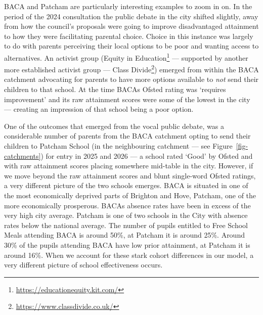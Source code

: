 \documentclass[
  11pt,
]{article}
\begin{document}
BACA and Patcham are particularly interesting examples to zoom in on. In
the period of the 2024 consultation the public debate in the city
shifted slightly, away from how the council's proposals were going to
improve disadvantaged attainment to how they were facilitating parental
choice. Choice in this instance was largely to do with parents
perceiving their local options to be poor and wanting access to
alternatives. An activist group (Equity in Education\footnote{\url{https://educationequity.kit.com/}}
--- supported by another more established activist group --- Class
Divide\footnote{\url{https://www.classdivide.co.uk/}}) emerged from
within the BACA catchment advocating for parents to have more options
available to \emph{not} send their children to that school. At the time
BACAs Ofsted rating was `requires improvement' and its raw attainment
scores were some of the lowest in the city --- creating an impression of
that school being a poor option.

One of the outcomes that emerged from the vocal public debate, was a
considerable number of parents from the BACA catchment opting to send
their children to Patcham School (in the neighbouring catchment --- see
Figure~\ref{fig-catchments}) for entry in 2025 and 2026 --- a school
rated `Good' by Ofsted and with raw attainment scores placing somewhere
mid-table in the city. However, if we move beyond the raw attainment
scores and blunt single-word Ofsted ratings, a very different picture of
the two schools emerges. BACA is situated in one of the most
economically deprived parts of Brighton and Hove, Patcham, one of the
more economically prosperous. BACAs absence rates have been in excess of
the very high city average. Patcham is one of two schools in the City
with absence rates below the national average. The number of pupils
entitled to Free School Meals attending BACA is around 50\%, at Patcham
it is around 25\%. Around 30\% of the pupils attending BACA have low
prior attainment, at Patcham it is around 16\%. When we account for
these stark cohort differences in our model, a very different picture of
school effectiveness occurs.
\end{document}
